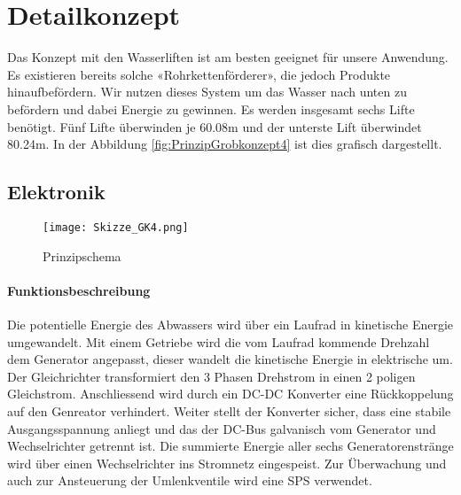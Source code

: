 \section{Detailkonzept} \label{sec:detailkonzept}

Das Konzept mit den Wasserliften ist am besten geeignet für unsere Anwendung. Es existieren bereits solche «Rohrkettenförderer», die jedoch Produkte hinaufbefördern. Wir nutzen dieses System um das Wasser nach unten zu befördern und dabei Energie zu gewinnen. Es werden insgesamt sechs Lifte benötigt. Fünf Lifte überwinden je 60.08\si{m} und der unterste Lift überwindet 80.24\si{m}. In der Abbildung \ref{fig:PrinzipGrobkonzept4}  ist dies grafisch dargestellt.

\subsection{Elektronik}

\begin{figure}[H]
\centering
\texttt{[image: Skizze\_GK4.png]}
\caption{Prinzipschema}
\label{fig:Prinzipschema}
\end{figure}

\paragraph{Funktionsbeschreibung}

Die potentielle Energie des Abwassers wird über ein Laufrad in kinetische Energie umgewandelt. Mit einem Getriebe wird die vom Laufrad kommende Drehzahl dem Generator angepasst, dieser wandelt die kinetische Energie in elektrische um. Der Gleichrichter transformiert den 3 Phasen Drehstrom in einen 2 poligen Gleichstrom. Anschliessend wird durch ein DC-DC Konverter eine Rückkoppelung auf den Genreator verhindert. Weiter stellt der Konverter sicher, dass eine stabile Ausgangsspannung anliegt und das der DC-Bus galvanisch vom Generator und Wechselrichter getrennt ist. Die summierte Energie aller sechs Generatorenstränge wird über einen Wechselrichter ins Stromnetz eingespeist. Zur Überwachung und auch zur Ansteuerung der Umlenkventile wird eine SPS verwendet.

